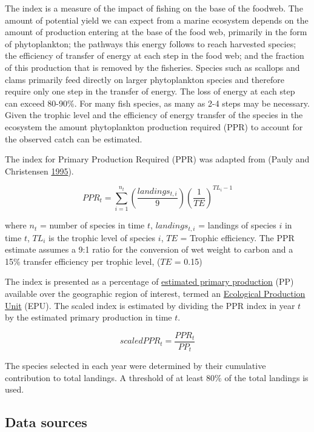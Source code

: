 \documentclass[
]{book}
\begin{document}
The index is a measure of the impact of fishing on the base of the foodweb. The amount of potential yield we can expect from a marine ecosystem depends on the amount of production entering at the base of the food web, primarily in the form of phytoplankton; the pathways this energy follows to reach harvested species; the efficiency of transfer of energy at each step in the food web; and the fraction of this production that is removed by the fisheries. Species such as scallops and clams primarily feed directly on larger phytoplankton species and therefore require only one step in the transfer of energy. The loss of energy at each step can exceed 80-90\%. For many fish species, as many as 2-4 steps may be necessary. Given the trophic level and the efficiency of energy transfer of the species in the ecosystem the amount phytoplankton production required (PPR) to account for the observed catch can be estimated.

The index for Primary Production Required (PPR) was adapted from (Pauly and Christensen \protect\hyperlink{ref-pauly1995ppr}{1995}).

\[PPR_t = \sum_{i=1}^{n_t}  \left(\frac{landings_{t,i}}{9}\right) \left(\frac{1}{TE}\right)^{TL_i-1}\]

where \(n_t\) = number of species in time \(t\), \(landings_{t,i}\) = landings of species \(i\) in time \(t\), \(TL_i\) is the trophic level of species \(i\), \(TE\) = Trophic efficiency. The PPR estimate assumes a 9:1 ratio for the conversion of wet weight to carbon and a 15\% transfer efficiency per trophic level, (\(TE\) = 0.15)

The index is presented as a percentage of \href{https://noaa-edab.github.io/tech-doc/chl-pp.html}{estimated primary production} (PP) available over the geographic region of interest, termed an \href{https://noaa-edab.github.io/tech-doc/comdat.html}{Ecological Production Unit} (EPU). The scaled index is estimated by dividing the PPR index in year \(t\) by the estimated primary production in time \(t\).

\[scaledPPR_t = \frac{PPR_t}{PP_t}\]

The species selected in each year were determined by their cumulative contribution to total landings. A threshold of at least 80\% of the total landings is used.

\hypertarget{data-sources}{%
\subsection{Data sources}\label{data-sources}}
\end{document}
